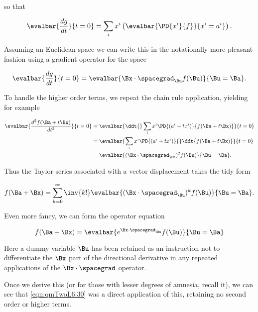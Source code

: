 so that

\begin{equation}\label{eqn:qmTwoL6:330}
\evalbar{\frac{dg}{dt} }{t=0}
= \sum_i x^i \left( 
\evalbar{ \PD{x^i}{f}}{x^i = a^i}
\right).
\end{equation}

Assuming an Euclidean space we can write this in the notationally more pleasant fashion using a gradient operator for the space

\begin{equation}\label{eqn:qmTwoL6:350}
\evalbar{\frac{dg}{dt} }{t=0} = \evalbar{\Bx \cdot \spacegrad_{\Bu} f(\Bu)}{\Bu = \Ba}.
\end{equation}

To handle the higher order terms, we repeat the chain rule application, yielding for example

\begin{align*}
\evalbar{\frac{d^2 f(\Ba + t \Bx)}{dt^2} }{t=0} 
&=
\evalbar{\ddt{} 
\sum_i x^i 
\PD{(a^i + t x^i)}{f(\Ba + t \Bx)} }{t=0}\\
&=
\evalbar{\sum_i x^i 
\PD{(a^i + t x^i)}{} \ddt{f(\Ba + t \Bx)}}{t=0} \\
&=
\evalbar{(\Bx \cdot \spacegrad_{\Bu})^2 f(\Bu)}{\Bu = \Ba}.
\end{align*}

Thus the Taylor series associated with a vector displacement takes the tidy form

\begin{equation}\label{eqn:qmTwoL6:370}
f(\Ba + \Bx) = \sum_{k=0}^\infty \inv{k!} \evalbar{(\Bx \cdot \spacegrad_{\Bu})^k f(\Bu)}{\Bu = \Ba}.
\end{equation}

Even more fancy, we can form the operator equation

\begin{equation}\label{eqn:qmTwoL6:390}
f(\Ba + \Bx) = \evalbar{e^{ \Bx \cdot \spacegrad_{\Bu} } f(\Bu)}{\Bu = \Ba}
\end{equation}

Here a dummy variable $\Bu$ has been retained as an instruction not to differentiate the $\Bx$ part of the directional derivative in any repeated applications of the $\Bx \cdot \spacegrad$ operator.

Once we derive this (or for those with lesser degrees of amnesia, recall it), we can see that \ref{eqn:qmTwoL6:30} was a direct application of this, retaining no second order or higher terms.

\EndArticle
